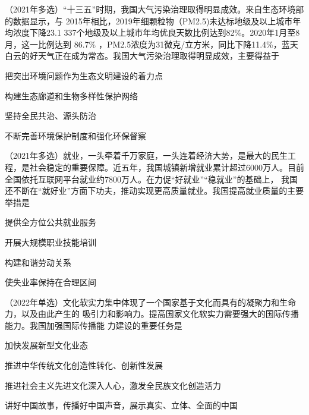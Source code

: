 \documentclass[lang=cn,blue,10pt,scheme=chinese,twocol]{zznote}
\begin{document}
\begin{example}
	（2021年多选）“十三五”时期，我国大气污染治理取得明显成效。来自生态环境部的数据显示，与
	2015年相比，2019年细颗粒物（PM2.5)未达标地级及以上城市年均浓度下降23.1%
	337个地级及以上城市年均优良天数比例达到82\%。2020年1月至8月，这一比例达到
	86.7\% ，PM2.5浓度为31微克/立方米，同比下降11.4\%，蓝天白云的好天气正在成为常态。我国大气污染治理取得明显成效，主要得益于
	\begin{choice}
		\item 把突出环境问题作为生态文明建设的着力点
		\item 构建生态廊道和生物多样性保护网络
		\item 坚持全民共治、源头防治
		\item 不断完善环境保护制度和强化环保督察
	\end{choice}
\end{example}

\begin{example}
	（2021年多选）就业，一头牵着千万家庭，一头连着经济大势，是最大的民生工程，是社会稳定的重要保障。近五年，我国城镇新增就业累计超过6000万人。目前全国依托互联网平台就业约7800万人。在力促“好就业”“稳就业”的基础上， 我国还不断在“就好业”方面下功夫，推动实现更高质量就业。我国提高就业质量的主要举措是

	\begin{choice}
		\item 提供全方位公共就业服务
		\item 开展大规模职业技能培训
		\item 构建和谐劳动关系
		\item 使失业率保持在合理区间
	\end{choice}
\end{example}

\begin{example}
	（2022年单选）文化软实力集中体现了一个国家基于文化而具有的凝聚力和生命力，以及由此产生的
	吸引力和影响力。提高国家文化软实力需要强大的国际传播能力。我国加强国际传播能
	力建设的重要任务是
	\begin{choice}
		\item 加快发展新型文化业态
		\item 推进中华传统文化创造性转化、创新性发展
		\item 推进社会主义先进文化深入人心，激发全民族文化创造活力
		\item 讲好中国故事，传播好中国声音，展示真实、立体、全面的中国
	\end{choice}
\end{example}
\end{document}
